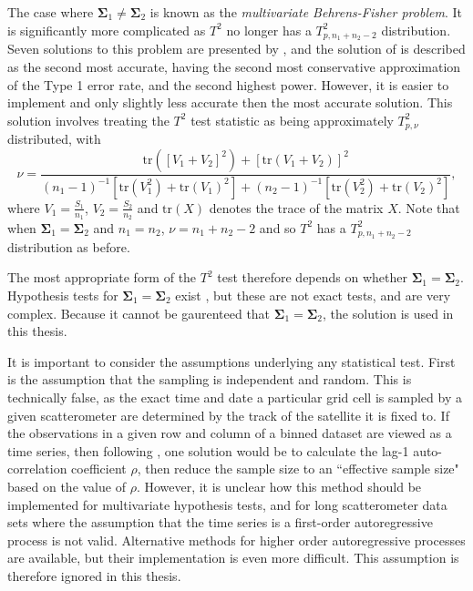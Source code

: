 \documentclass[12pt]{book}
\begin{document}
The case where $\boldsymbol{\Sigma}_1\ne\boldsymbol{\Sigma}_2$ is known as the \textit{multivariate Behrens-Fisher problem}. It is significantly more complicated as $T^2$ no longer has a $T^2_{p,n_1+n_2-2}$  distribution. Seven solutions to this problem are presented by \citet[]{christensen97}, and the solution of \citet[]{nel86} is described as the second most accurate, having the second most conservative approximation of the Type 1 error rate, and the second highest power. However, it is easier to implement and only slightly less accurate then the most accurate solution. This solution involves treating the $T^2$ test statistic as being approximately $T^2_{p,\nu}$ distributed, with
\begin{equation}
\nu=\frac{\text{tr}\left(\left[V_1+V_2\right]^2\right)+\left[\text{tr}\left(V_1+V_2\right)\right]^2}{(n_1-1)^{-1}\left[\text{tr}\left(V_1^2\right)+\text{tr}\left(V_1\right)^2\right] + (n_2-1)^{-1}\left[\text{tr}\left(V_2^2\right)+\text{tr}\left(V_2\right)^2\right]},
\end{equation}
where $V_1=\frac{S_1}{n_1}$, $V_2=\frac{S_2}{n_2}$ and $\text{tr}(X)$ denotes the trace of the matrix $X$. Note that when $\boldsymbol{\Sigma}_1=\boldsymbol{\Sigma}_2$ and $n_1=n_2$, $\nu=n_1+n_2-2$ and so $T^2$ has a $T^2_{p,n_1+n_2-2}$ distribution as before.

The most appropriate form of the $T^2$ test therefore depends on whether $\boldsymbol{\Sigma}_1=\boldsymbol{\Sigma}_2$. Hypothesis tests for $\boldsymbol{\Sigma}_1=\boldsymbol{\Sigma}_2$ exist \cite[p.138]{rencher98}, but these are not exact tests, and are very complex. Because it cannot be gaurenteed that $\boldsymbol{\Sigma}_1=\boldsymbol{\Sigma}_2$, the \citet{nel86} solution is used in this thesis. 

It is important to consider the assumptions underlying any statistical test. First is the assumption that the sampling is independent and random. This is technically false, as the exact time and date a particular grid cell is sampled by a given scatterometer are determined by the track of the satellite it is fixed to. If the observations in a given row and column of a binned dataset are viewed as a time series, then following \citet[p. 148]{wilks11}, one solution would be to calculate the lag-1 auto-correlation coefficient $\rho$, then reduce the sample size to an ``effective sample size" based on the value of $\rho$. However, it is unclear how this method should be implemented for multivariate hypothesis tests, and for long scatterometer data sets where the assumption that the time series is a first-order autoregressive process is not valid. Alternative methods for higher order autoregressive processes are available, but their implementation is even more difficult. This assumption is therefore ignored in this thesis. 
\end{document}
